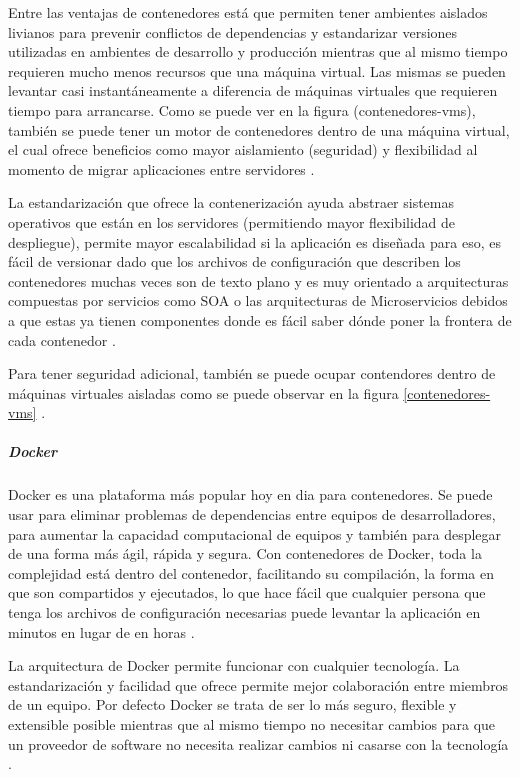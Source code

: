 Entre las ventajas de contenedores está que permiten tener ambientes aislados livianos para prevenir conflictos de dependencias y estandarizar versiones utilizadas en ambientes de desarrollo y producción mientras que al mismo tiempo requieren mucho menos recursos que una máquina virtual. Las mismas se pueden levantar casi instantáneamente a diferencia de máquinas virtuales que requieren tiempo para arrancarse. Como se puede ver en la figura (contenedores-vms), también se puede tener un motor de contenedores dentro de una máquina virtual, el cual ofrece beneficios como mayor aislamiento (seguridad) y flexibilidad al momento de migrar aplicaciones entre servidores \citep{Docker-Containers}.

La estandarización que ofrece la contenerización ayuda abstraer sistemas operativos que están en los servidores (permitiendo mayor flexibilidad de despliegue),  permite mayor escalabilidad si la aplicación es diseñada para eso, es fácil de versionar dado que los archivos de configuración que describen los contenedores muchas veces son de texto plano y es muy orientado a arquitecturas compuestas por servicios como SOA o las arquitecturas de Microservicios debidos a que estas ya tienen componentes donde es fácil saber dónde poner la frontera de cada contenedor \citep{DigitalOcean-Docker-Ecosystem}.

Para tener seguridad adicional, también se puede ocupar contendores dentro de máquinas virtuales aisladas como se puede observar en la figura \ref{contenedores-vms} \citep{Docker-Containers}.

\subparagraph{Docker}
Docker es una plataforma más popular hoy en dia para contenedores. Se puede usar para eliminar problemas de dependencias entre equipos de desarrolladores, para aumentar la capacidad computacional de equipos y también para desplegar de una forma más ágil, rápida y segura. Con contenedores de Docker, toda la complejidad está dentro del contenedor, facilitando su compilación, la forma en que son compartidos y ejecutados, lo que hace fácil que cualquier persona que tenga los archivos de configuración necesarias puede levantar la aplicación en minutos en lugar de en horas \citep{Docker-What-Is}.

La arquitectura de Docker permite funcionar con cualquier tecnología. La estandarización y facilidad que ofrece permite mejor colaboración entre miembros de un equipo. Por defecto Docker se trata de ser lo más seguro, flexible y extensible posible mientras que al mismo tiempo no necesitar cambios para que un proveedor de software no necesita realizar cambios ni casarse con la tecnología \citep{Docker}.


